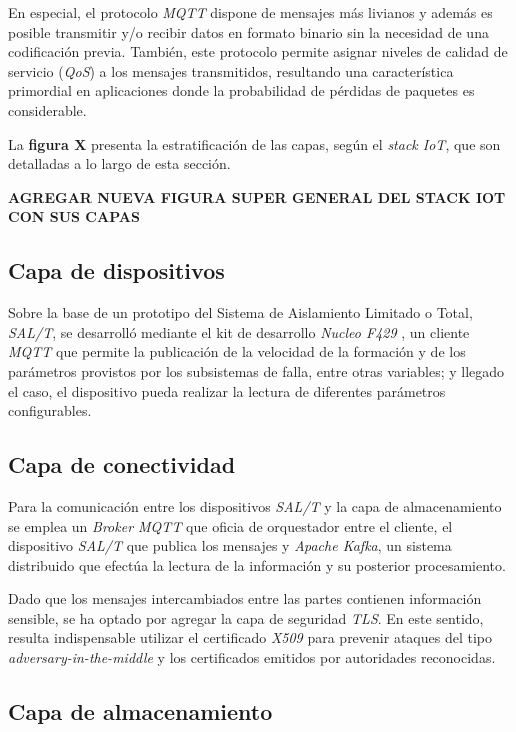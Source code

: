En especial, el protocolo \textit{MQTT} dispone de mensajes más livianos y además es posible transmitir y/o recibir datos en formato binario sin la necesidad de una codificación previa. También, este protocolo permite asignar niveles de calidad de servicio (\textit{QoS}) a los mensajes transmitidos, resultando una característica primordial en aplicaciones donde la probabilidad de pérdidas de paquetes es considerable.

La \textbf{figura X} presenta la estratificación de las capas, según el \textit{stack IoT}, que son detalladas a lo largo de esta sección.


\textbf{AGREGAR NUEVA FIGURA SUPER GENERAL DEL STACK IOT CON SUS CAPAS}


\subsection{Capa de dispositivos}

Sobre la base de un prototipo del Sistema de Aislamiento Limitado o Total, \textit{SAL/T}, se desarrolló mediante el kit de desarrollo \textit{Nucleo F429} \citep{nucleo-kit}, un cliente \textit{MQTT} que permite la publicación de la velocidad de la formación y de los parámetros provistos por los subsistemas de falla, entre otras variables; y llegado el caso, el dispositivo pueda realizar la lectura de diferentes parámetros configurables.

\subsection{Capa de conectividad}

Para la comunicación entre los dispositivos \textit{SAL/T} y la capa de almacenamiento se emplea un \textit{Broker MQTT} que oficia de orquestador entre el cliente, el dispositivo \textit{SAL/T} que publica los mensajes y \textit{Apache Kafka}, un sistema distribuido que efectúa la lectura de la información y su posterior procesamiento. 

Dado que los mensajes intercambiados entre las partes contienen información sensible, se ha optado por agregar la capa de seguridad \textit{TLS}. En este sentido, resulta indispensable utilizar el certificado \textit{X509} para prevenir ataques del tipo \textit{adversary-in-the-middle} y los certificados emitidos por autoridades reconocidas.


\subsection{Capa de almacenamiento}

